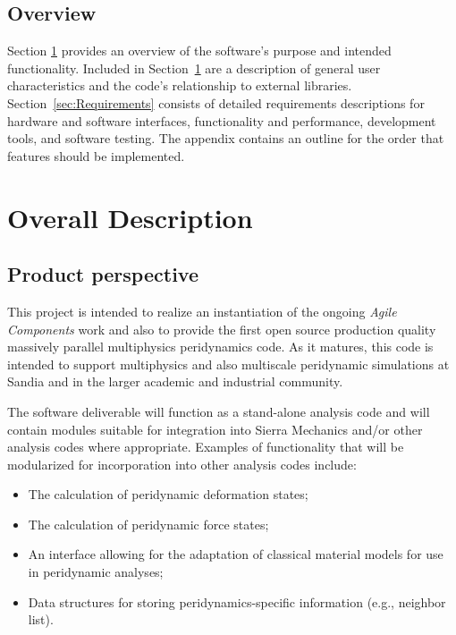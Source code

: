 \documentclass[10pt]{article}
\theoremstyle{plain}
\theoremstyle{definition}
\begin{document}
\subsection{Overview}

\noindent
Section \ref{sec:Description} provides an overview of the software's purpose and intended functionality.  Included in Section~\ref{sec:Description} are a description of general user characteristics and the code's relationship to external libraries.  Section~\ref{sec:Requirements} consists of detailed requirements descriptions for hardware and software interfaces, functionality and performance, development tools, and software testing. The appendix contains an outline for the order that features should be implemented.

\section{Overall Description} \label{sec:Description}

\subsection{Product perspective}

This project is intended to realize an instantiation of the ongoing \emph{Agile Components} work and also to provide the first open source production quality massively parallel multiphysics peridynamics code. As it matures, this code is intended to support multiphysics and also multiscale peridynamic simulations at Sandia and in the larger academic and industrial community.

The software deliverable will function as a stand-alone analysis code and will contain modules suitable for integration into Sierra Mechanics and/or other analysis codes where appropriate.  Examples of functionality that will be modularized for incorporation into other analysis codes include:
\begin{itemize}
\item The calculation of peridynamic deformation states;
\item The calculation of peridynamic force states;
\item An interface allowing for the adaptation of classical material models for use in peridynamic analyses;
\item Data structures for storing peridynamics-specific information (e.g., neighbor list).
\end{itemize}
\end{document}
